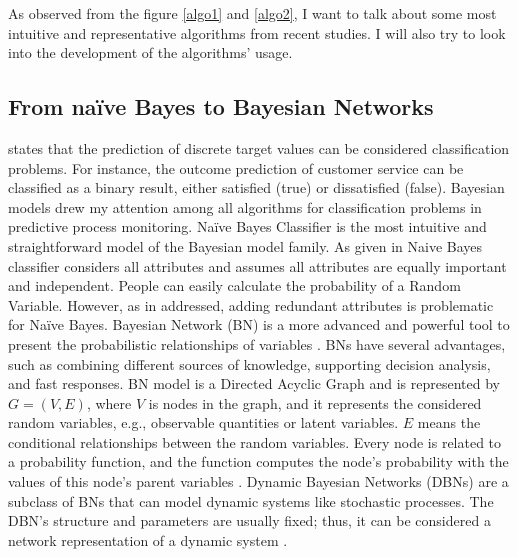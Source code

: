 \documentclass[runningheads]{llncs}
\begin{document}
		As observed from the figure \ref{algo1} and \ref{algo2}, I want to talk about some most intuitive and representative algorithms from recent studies. I will also try to look into the development of the algorithms' usage.
		
		\subsection{From naïve Bayes to Bayesian Networks}
		\cite{art-6} states that the prediction of discrete target values can be considered classification problems. For instance, the outcome prediction of customer service can be classified as a binary result, either satisfied (true) or dissatisfied (false). Bayesian models drew my attention among all algorithms for classification problems in predictive process monitoring. Naïve Bayes Classifier is the most intuitive and straightforward model of the Bayesian model family. As given in \cite{slide-1} Naive Bayes classifier considers all attributes and assumes all attributes are equally important and independent. People can easily calculate the probability of a Random Variable. However, as in \cite{slide-1} addressed, adding redundant attributes is problematic for Naïve Bayes. Bayesian Network (BN) is a more advanced and powerful tool to present the probabilistic relationships of variables \cite{art-4}. BNs have several advantages, such as combining different sources of knowledge, supporting decision analysis, and fast responses. BN model is a Directed Acyclic Graph and is represented by $ G = (V, E)$, where $V$ is nodes in the graph, and it represents the considered random variables, e.g., observable quantities or latent variables. $E$ means the conditional relationships between the random variables. Every node is related to a probability function, and the function computes the node's probability with the values of this node's parent variables \cite{art-4}. Dynamic Bayesian Networks (DBNs) are a subclass of BNs that can model dynamic systems like stochastic processes. The DBN's structure and parameters are usually fixed; thus, it can be considered a network representation of a dynamic system \cite{art-25}.   		
		
\end{document}
